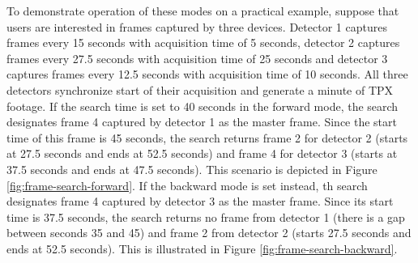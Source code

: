 

To demonstrate operation of these modes on a practical example, suppose that users are interested in frames captured by three devices. Detector 1 captures frames every 15 seconds with acquisition time of 5 seconds, detector 2 captures frames every 27.5 seconds with acquisition time of 25 seconds and detector 3 captures frames every 12.5 seconds with acquisition time of 10 seconds. All three detectors synchronize start of their acquisition and generate a minute of TPX footage. If the search time is set to 40 seconds in the forward mode, the search designates frame 4 captured by detector 1 as the master frame. Since the start time of this frame is 45 seconds, the search returns frame 2 for detector 2 (starts at 27.5 seconds and ends at 52.5 seconds) and frame 4 for detector 3 (starts at 37.5 seconds and ends at 47.5 seconds). This scenario is depicted in Figure \ref{fig:frame-search-forward}. If the backward mode is set instead, th search designates frame 4 captured by detector 3 as the master frame. Since its start time is 37.5 seconds, the search returns no frame from detector 1 (there is a gap between seconds 35 and 45) and frame 2 from detector 2 (starts 27.5 seconds and ends at 52.5 seconds). This is illustrated in Figure \ref{fig:frame-search-backward}.


